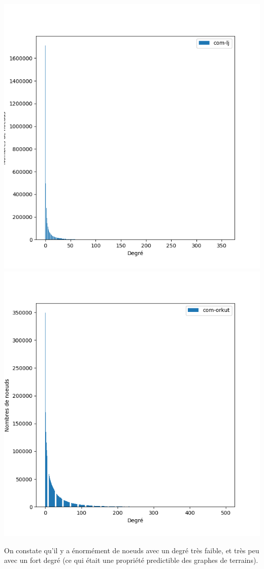 \documentclass[a4paper]{report}
\begin{document}
\begin{center}
  \includegraphics[height=.25\paperwidth]{assets/com-lj-dist.png}
  \includegraphics[height=.25\paperwidth]{assets/com-orkut-dist.png}\\
\end{center}
On constate qu'il y a énormément de noeuds avec un degré très faible, et très peu avec un fort degré (ce qui était une propriété predictible des graphes de terrains).
\end{document}
